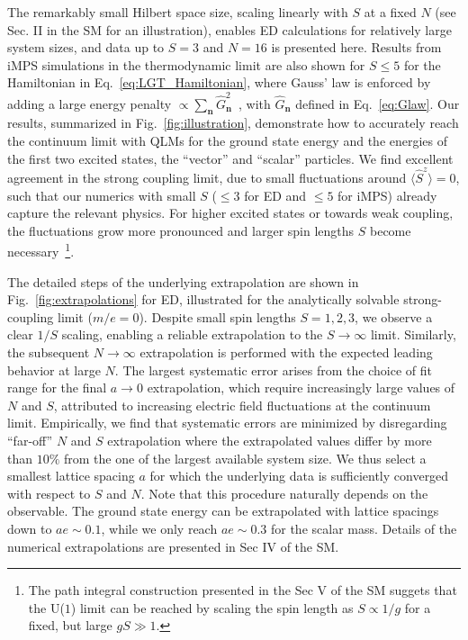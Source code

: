 \documentclass[aps,prl,reprint,twocolumn,superscriptaddress,floatfix,nofootinbib]{revtex4-1}
\begin{document}
	The remarkably small Hilbert space size, scaling linearly with $S$ at a fixed $N$ (see Sec. II in the SM for an illustration), enables ED calculations for relatively large system sizes, and data up to $S=3$ and $N=16$ is presented here. Results from iMPS simulations in the thermodynamic limit are also shown for $S \le 5$ for the Hamiltonian in Eq.~\eqref{eq:LGT_Hamiltonian}, where Gauss' law is enforced by adding a large energy penalty $\propto \sum_\mathbf{n}\hat{G}^2_\mathbf{n}$~\cite{Halimeh2020, vandamme2020gaugesymmetry}, with $\hat{G}_\mathbf{n}$ defined in Eq.~\eqref{eq:Glaw}. Our results, summarized in Fig.~\ref{fig:illustration}, demonstrate how to accurately reach the continuum limit with QLMs for the ground state energy and the energies of the first two excited states, the ``vector'' and ``scalar'' particles. We find excellent agreement in the strong coupling limit, due to small fluctuations around $\langle\hat{S}^z\rangle = 0$, such that our numerics with small $S$ ($\le 3$ for ED and $\le 5$ for iMPS) already capture the relevant physics. For higher excited states or towards weak coupling, the fluctuations grow more pronounced and larger spin lengths $S$ become necessary~\footnote{The path integral construction presented in the Sec V of the SM suggets that the U($1$) limit can be reached by scaling the spin length as $S \propto 1/g$ for a fixed, but large $gS \gg 1$.}. 
	
	
	The detailed steps of the underlying extrapolation are shown in Fig.~\ref{fig:extrapolations} for ED, illustrated for the analytically solvable strong-coupling limit ($m/e=0$). Despite small spin lengths $S=1,2,3$, we observe a clear $1/S$ scaling, enabling a reliable extrapolation to the $S\rightarrow \infty$ limit. Similarly, the subsequent $N\rightarrow \infty$ extrapolation is performed with the expected leading behavior at large $N$. The largest systematic error arises from the choice of fit range for the final $a \rightarrow 0$ extrapolation, which require increasingly large values of $N$ and $S$, attributed to increasing electric field fluctuations at the continuum limit. Empirically, we find that systematic errors are minimized by disregarding ``far-off'' $N$ and $S$ extrapolation where the extrapolated values differ by more than $10 \%$ from the one of the largest available system size. We thus select a smallest lattice spacing $a$ for which the underlying data is sufficiently converged with respect to $S$ and $N$. Note that this procedure naturally depends on the observable. The ground state energy can be extrapolated with lattice spacings down to $ae\sim0.1$, while we only reach $ae\sim0.3$ for the scalar mass. Details of the numerical extrapolations are presented in Sec IV of the SM.
	
\end{document}
